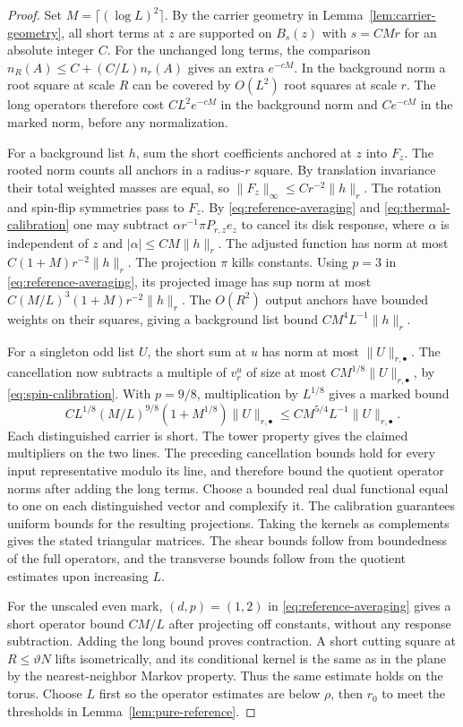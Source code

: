 \documentclass[11pt]{article}
\theoremstyle{definition}
\begin{document}
\begin{proof}
Set \(M=\lceil(\log L)^2\rceil\). By the carrier geometry in
Lemma~\ref{lem:carrier-geometry}, all short terms at \(z\) are
supported on \(B_s(z)\) with \(s=CMr\) for an absolute integer \(C\).
For the unchanged long terms, the comparison
\(n_R(A)\le C+(C/L)n_r(A)\) gives an extra \(e^{-cM}\).
In the background norm a root square at scale \(R\) can be covered
by \(O(L^2)\) root squares at scale \(r\). The long operators
therefore cost \(CL^2e^{-cM}\) in the background norm and
\(Ce^{-cM}\) in the marked norm, before any normalization.

For a background list \(h\), sum the short coefficients anchored at
\(z\) into \(F_z\). The rooted norm counts all anchors in a radius-\(r\)
square. By translation invariance their total weighted masses are
equal, so \(\|F_z\|_\infty\le C r^{-2}\|h\|_r\).
The rotation and spin-flip symmetries pass to \(F_z\).
By \eqref{eq:reference-averaging} and \eqref{eq:thermal-calibration}
one may subtract \(\alpha r^{-1}\pi P_{r,z}e_z\) to cancel its
disk response, where \(\alpha\) is independent of \(z\) and
\(|\alpha|\le CM\|h\|_r\).
The adjusted function has norm at most \(C(1+M)r^{-2}\|h\|_r\).
The projection \(\pi\) kills constants. Using \(p=3\) in
\eqref{eq:reference-averaging}, its projected image has sup norm at
most \(C(M/L)^3(1+M)r^{-2}\|h\|_r\).
The \(O(R^2)\) output anchors have bounded weights on their squares,
giving a background list bound \(CM^4 L^{-1}\|h\|_r\).

For a singleton odd list \(U\), the short sum at \(u\) has norm at
most \(\|U\|_{r,\bullet}\). The cancellation now subtracts a multiple
of \(v_r^u\) of size at most \(CM^{1/8}\|U\|_{r,\bullet}\), by
\eqref{eq:spin-calibration}. With \(p=9/8\), multiplication by
\(L^{1/8}\) gives a marked bound
\[
 C L^{1/8}(M/L)^{9/8}(1+M^{1/8})\|U\|_{r,\bullet}
 \le C M^{5/4} L^{-1}\|U\|_{r,\bullet}.
\]
Each distinguished carrier is short. The tower property gives the
claimed multipliers on the two lines. The preceding cancellation
bounds hold for every input representative modulo its line, and
therefore bound the quotient operator norms after adding the long
terms. Choose a bounded real dual functional equal to one on each
distinguished vector and complexify it. The calibration guarantees
uniform bounds for the resulting projections. Taking the kernels
as complements gives the stated triangular matrices. The shear
bounds follow from boundedness of the full operators, and the
transverse bounds follow from the quotient estimates upon increasing \(L\).

For the unscaled even mark, \((d,p)=(1,2)\) in
\eqref{eq:reference-averaging} gives a short operator bound
\(CM/L\) after projecting off constants, without any response
subtraction. Adding the long bound proves contraction. A short
cutting square at \(R\le\vartheta N\) lifts isometrically, and its
conditional kernel is the same as in the plane by the nearest-neighbor
Markov property. Thus the same estimate holds on the torus. Choose
\(L\) first so the operator estimates are below \(\rho\), then \(r_0\)
to meet the thresholds in Lemma~\ref{lem:pure-reference}.
\end{proof}
\end{document}
